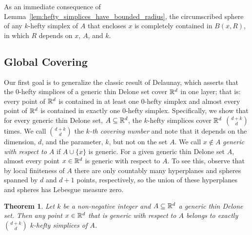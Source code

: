 \documentclass[10pt,a4paper]{article}
\newtheorem{theorem}{Theorem}[section]
\newcommand {\mm}[1] {\ifmmode{#1}\else{\mbox{\(#1\)}}\fi}
\theoremstyle{plain}
\newcommand{\Rspace}        {\mm{{\mathbb R}}}
\begin{document}
As an immediate consequence of Lemma~\ref{lem:hefty_simplices_have_bounded_radius}, the circumscribed sphere of any $k$-hefty simplex of $A$ that encloses $x$ is completely contained in $B(x,R)$, in which $R$ depends on $x$, $A$, and $k$.
\subsection{Global Covering}
\label{sec:2.2}
Our first goal is to generalize the classic result of Delaunay, which asserts that the $0$-hefty simplices of a generic thin Delone set cover $\Rspace^d$ in one layer; that is: every point of $\Rspace^d$ is contained in at least one $0$-hefty simplex and almost every point of $\Rspace^d$ is contained in exactly one $0$-hefty simplex.
Specifically, we show that for every generic thin Delone set, $A \subseteq \Rspace^d$, the $k$-hefty simplices cover $\Rspace^d$ $\binom{d+k}{d}$ times.
We call $\binom{d+k}{d}$ the \emph{$k$-th covering number} and note that it depends on the dimension, $d$, and the parameter, $k$, but not on the set $A$.
We call $x \notin A$ \emph{generic with respect to $A$} if $A \cup \{x\}$ is generic.
For a given generic thin Delone set $A$, almost every point $x \in \Rspace^d$ is generic with respect to $A$.
To see this, observe that by local finiteness of $A$ there are only countably many hyperplanes and spheres spanned by $d$ and $d+1$ points, respectively, so the union of these hyperplanes and spheres has Lebesgue measure zero.

\begin{theorem}
  \label{thm:global_covering}
  Let $k$ be a non-negative integer and $A \subseteq \Rspace^d$ a generic thin Delone set.
  Then any point $x \in \Rspace^d$ that is generic with respect to $A$ belongs to exactly $\binom{d+k}{d}$ $k$-hefty simplices of $A$.
\end{theorem}
\end{document}
